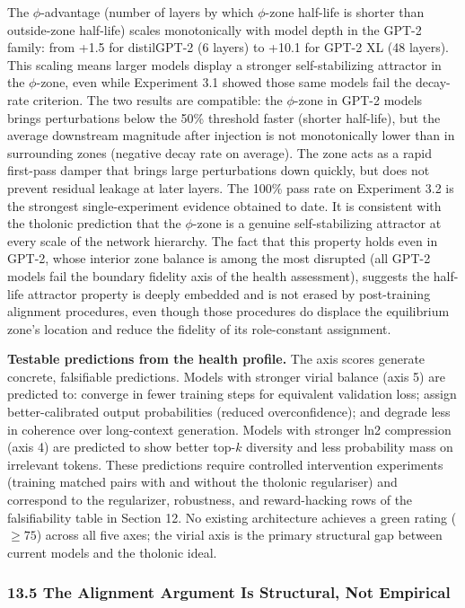 \documentclass[
  11pt,
  letterpaper,
]{article}
\begin{document}
The \(\phi\)-advantage (number of layers by which \(\phi\)-zone
half-life is shorter than outside-zone half-life) scales monotonically
with model depth in the GPT-2 family: from +1.5 for distilGPT-2 (6
layers) to +10.1 for GPT-2 XL (48 layers). This scaling means larger
models display a stronger self-stabilizing attractor in the
\(\phi\)-zone, even while Experiment 3.1 showed those same models fail
the decay-rate criterion. The two results are compatible: the
\(\phi\)-zone in GPT-2 models brings perturbations below the 50\%
threshold faster (shorter half-life), but the average downstream
magnitude after injection is not monotonically lower than in surrounding
zones (negative decay rate on average). The zone acts as a rapid
first-pass damper that brings large perturbations down quickly, but does
not prevent residual leakage at later layers. The 100\% pass rate on
Experiment 3.2 is the strongest single-experiment evidence obtained to
date. It is consistent with the tholonic prediction that the
\(\phi\)-zone is a genuine self-stabilizing attractor at every scale of
the network hierarchy. The fact that this property holds even in GPT-2,
whose interior zone balance is among the most disrupted (all GPT-2
models fail the boundary fidelity axis of the health assessment),
suggests the half-life attractor property is deeply embedded and is not
erased by post-training alignment procedures, even though those
procedures do displace the equilibrium zone's location and reduce the
fidelity of its role-constant assignment.

\textbf{Testable predictions from the health profile.} The axis scores
generate concrete, falsifiable predictions. Models with stronger virial
balance (axis 5) are predicted to: converge in fewer training steps for
equivalent validation loss; assign better-calibrated output
probabilities (reduced overconfidence); and degrade less in coherence
over long-context generation. Models with stronger ln2 compression (axis
4) are predicted to show better top-\(k\) diversity and less probability
mass on irrelevant tokens. These predictions require controlled
intervention experiments (training matched pairs with and without the
tholonic regulariser) and correspond to the regularizer, robustness, and
reward-hacking rows of the falsifiability table in Section 12. No
existing architecture achieves a green rating (\(\geq 75\)) across all
five axes; the virial axis is the primary structural gap between current
models and the tholonic ideal.

\subsubsection{13.5 The Alignment Argument Is Structural, Not
Empirical}\label{the-alignment-argument-is-structural-not-empirical}
\end{document}
